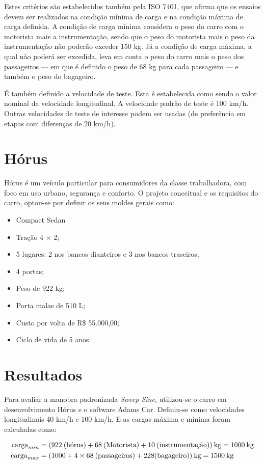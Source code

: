 \documentclass[a4paper, 12pt]{article}
\begin{document}
Estes critérios são estabelecidos também pela ISO 7401, que afirma que  os ensaios devem ser realizados na condição mínima de carga e na condição máxima de carga definida. A condição de carga mínima considera o peso do carro com o motorista mais a instrumentação, sendo que o peso do motorista mais o peso da instrumentação não poderão exceder 150 kg. Já a condição de carga máxima, a qual não poderá ser excedida, leva em conta o peso do carro mais o peso dos passageiros --- em que é definido o peso de 68 kg para cada passageiro --- e também o peso do bagageiro.


É também definido a velocidade de teste. Esta é estabelecida como sendo o valor nominal da velocidade longitudinal. A velocidade padrão de teste é 100 km/h. Outras velocidades de teste de interesse podem ser usadas (de preferência em etapas com diferenças de 20 km/h).

\section{Hórus}

Hórus é um veículo particular para consumidores da classe trabalhadora, com foco em uso urbano, segurança e conforto. O projeto conceitual e os requisitos do carro, optou-se por definir os seus moldes gerais como:
\begin{itemize}
    \item Compact Sedan
    \item Tração 4 × 2;
    \item 5 lugares: 2 nos bancos dianteiros e 3 nos bancos traseiros;
    \item 4 portas;
    \item Peso de 922 kg;
    \item Porta malas de 510 L;
    \item Custo por volta de R\$ 55.000,00;
    \item Ciclo de vida de 5 anos.
\end{itemize}


\section{Resultados}

Para avaliar a manobra padronizada \textit{Sweep Sine}, utilizou-se o carro em desenvolvimento Hórus e o software Adams Car. Definiu-se como velocidades longitudinais 40 km/h e 100 km/h. E as cargas máxima e mínima foram calculadas como:

\begin{align}
\mathrm{carga}_{min} &= (922 \: \textup{(hórus)} + 68 \: \textup{(Motorista)} + 10 \: \textup{(instrumentação)} ) \: \textup{kg} = 1000 \: \textup{kg} \\ 
\mathrm{carga}_{max} &= (1000 + 4\times 68 \: \textup{(passageiros)} + 228 \textup{(bagageiro)}) \: \textup{kg} = 1500 \: \textup{kg}
\end{align}
\end{document}
